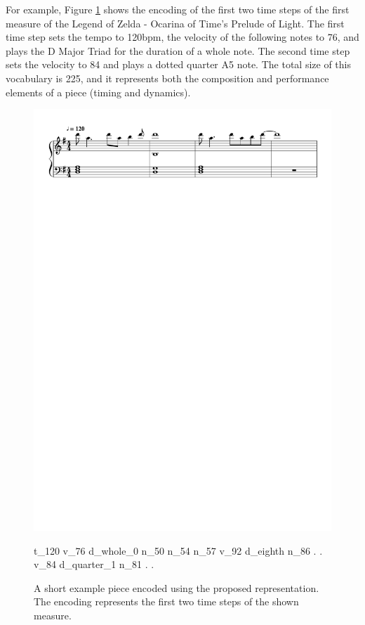 For example, Figure \ref{fig:enc_ex} shows the encoding of the first two time steps of the first measure of the Legend of Zelda - Ocarina of Time's Prelude of Light. The first time step sets the tempo to 120bpm, the velocity of the following notes to 76, and plays the D Major Triad for the duration of a whole note. The second time step sets the velocity to 84 and plays a dotted quarter A5 note. The total size of this vocabulary is 225, and it represents both the composition and performance elements of a piece (timing and dynamics).

\begin{figure}
 \centering
 \includegraphics[width=.95\columnwidth]{imgs/ismir19/encoding.pdf}
\begin{spverbatim}
        t_120 v_76 d_whole_0 n_50 n_54 n_57 v_92 d_eighth n_86 . . v_84
        d_quarter_1 n_81 . .
\end{spverbatim}

 \caption{A short example piece encoded using the proposed representation. The encoding represents the first two time steps of the shown measure.}
 \label{fig:enc_ex}
\end{figure}

